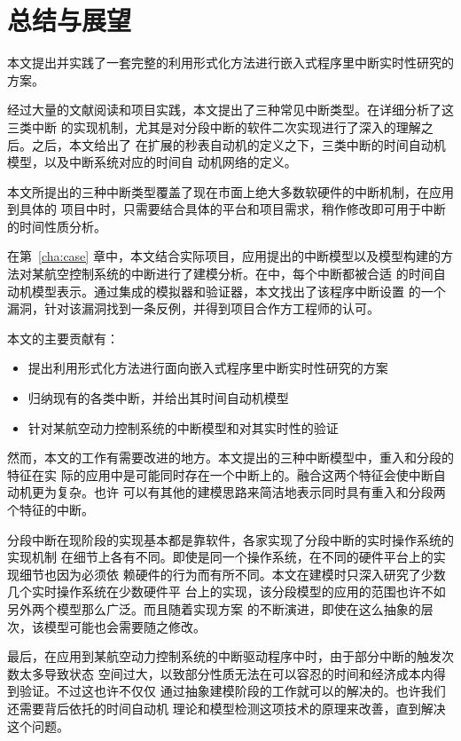 
\chapter{总结与展望}
\label{cha:sum}

本文提出并实践了一套完整的利用形式化方法进行嵌入式程序里中断实时性研究的方案。

经过大量的文献阅读和项目实践，本文提出了三种常见中断类型。在详细分析了这三类中断
的实现机制，尤其是对分段中断的软件二次实现进行了深入的理解之后。之后，本文给出了
在扩展的秒表自动机的定义之下，三类中断的时间自动机模型，以及中断系统对应的时间自
动机网络的定义。

本文所提出的三种中断类型覆盖了现在市面上绝大多数软硬件的中断机制，在应用到具体的
项目中时，只需要结合具体的平台和项目需求，稍作修改即可用于中断的时间性质分析。

在第~\ref{cha:case} 章中，本文结合实际项目，应用提出的中断模型以及模型构建的方
法对某航空控制系统的中断进行了建模分析。在\uppaal 中，每个中断都被合适
的时间自动机模型表示。通过\uppaal 集成的模拟器和验证器，本文找出了该程序中断设置
的一个漏洞，针对该漏洞找到一条反例，并得到项目合作方工程师的认可。

本文的主要贡献有：

\begin{itemize}
	\item 提出利用形式化方法进行面向嵌入式程序里中断实时性研究的方案
	\item 归纳现有的各类中断，并给出其时间自动机模型
	\item 针对某航空动力控制系统的中断模型和对其实时性的验证
\end{itemize}

然而，本文的工作有需要改进的地方。本文提出的三种中断模型中，重入和分段的特征在实
际的应用中是可能同时存在一个中断上的。融合这两个特征会使中断自动机更为复杂。也许
可以有其他的建模思路来简洁地表示同时具有重入和分段两个特征的中断。

分段中断在现阶段的实现基本都是靠软件，各家实现了分段中断的实时操作系统的实现机制
在细节上各有不同。即使是同一个操作系统，在不同的硬件平台上的实现细节也因为必须依
赖硬件的行为而有所不同。本文在建模时只深入研究了少数几个实时操作系统在少数硬件平
台上的实现，该分段模型的应用的范围也许不如另外两个模型那么广泛。而且随着实现方案
的不断演进，即使在这么抽象的层次，该模型可能也会需要随之修改。

最后，在应用到某航空动力控制系统的中断驱动程序中时，由于部分中断的触发次数太多导致状态
空间过大，以致部分性质无法在可以容忍的时间和经济成本内得到验证。不过这也许不仅仅
通过抽象建模阶段的工作就可以的解决的。也许我们还需要\uppaal 背后依托的时间自动机
理论和模型检测这项技术的原理来改善，直到解决这个问题。

